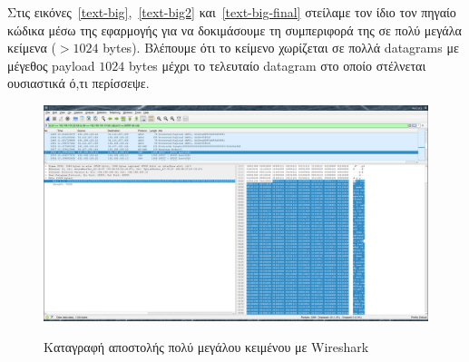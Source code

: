 \documentclass{article}
\begin{document}
Στις εικόνες~\ref{text-big},~\ref{text-big2} και~\ref{text-big-final} στείλαμε τον ίδιο 
τον πηγαίο κώδικα μέσω της εφαρμογής για να 
δοκιμάσουμε τη συμπεριφορά της σε πολύ μεγάλα κείμενα ($> 1024$ bytes). Βλέπουμε ότι το 
κείμενο χωρίζεται σε πολλά datagrams με μέγεθος payload $1024$ bytes μέχρι το τελευταίο
datagram στο οποίο στέλνεται ουσιαστικά ό,τι περίσσεψε.

\begin{figure}%
    \centering
        {\includegraphics[scale=0.1]{textbigsend}}
        \caption{Καταγραφή αποστολής πολύ μεγάλου κειμένου με Wireshark}
\end{figure}
\end{document}
